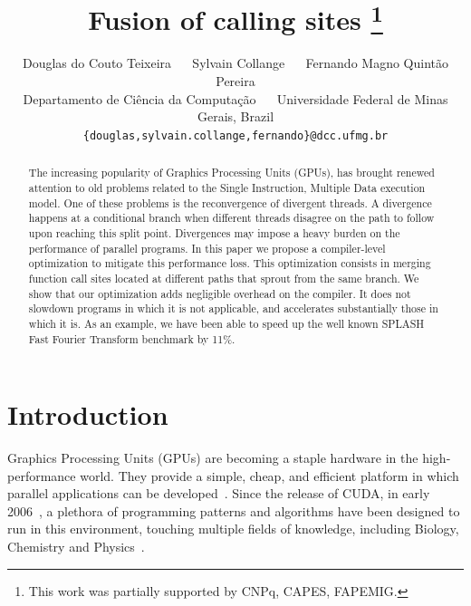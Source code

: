 \documentclass[times,10pt,twocolumn]{article}
\begin{document}
\title{Fusion of calling sites
\thanks{This work was partially supported by CNPq, CAPES, FAPEMIG.}
}

\author{Douglas do Couto Teixeira ~~ Sylvain Collange ~~ Fernando Magno Quint\~{a}o Pereira\\
Departamento de Ci\^{e}ncia da Computa\c{c}\~{a}o ~~
Universidade Federal de Minas Gerais, Brazil\\
{\small {\tt \{douglas,sylvain.collange,fernando\}@dcc.ufmg.br}}
} 

\maketitle
\thispagestyle{empty}

\maketitle

\begin{abstract}
The increasing popularity of Graphics Processing Units (GPUs), has brought
renewed attention to old problems related to the Single Instruction, Multiple
Data execution model.
One of these problems is the reconvergence of divergent threads.
A divergence happens at a conditional branch when different threads disagree on
the path to follow upon reaching this split point.
Divergences may impose a heavy burden on the performance of parallel programs.
In this paper we propose a compiler-level optimization to mitigate this
performance loss.
This optimization consists in merging function call sites located at different
paths that sprout from the same branch.
We show that our optimization adds negligible overhead on the compiler.
It does not slowdown programs in which it is not applicable, and accelerates
substantially those in which it is.
As an example, we have been able to speed up the well known SPLASH Fast Fourier
Transform benchmark by 11\%.
\end{abstract}


\section{Introduction}
\label{sec:int}

Graphics Processing Units (GPUs) are becoming a staple hardware in the
high-performance world.
They provide a simple, cheap, and efficient platform in which parallel
applications can be developed~\cite{Nickolls10}.
Since the release of CUDA, in early 2006~\cite{Garland08}, a plethora
of programming patterns and algorithms have been designed to run in this
environment, touching multiple fields of knowledge, including Biology,
Chemistry and Physics~\cite{Navarro14}.
\end{document}
